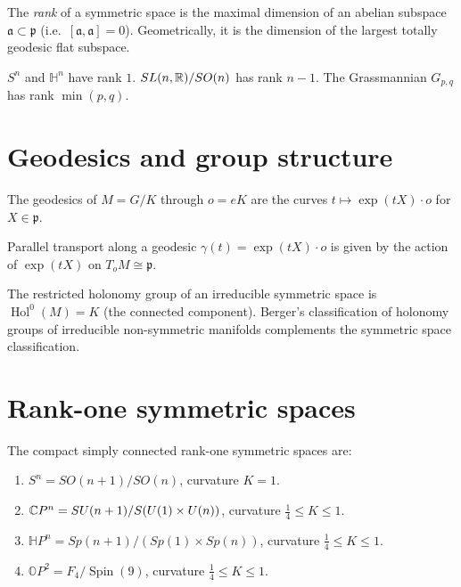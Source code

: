 \begin{definition}[Rank]
The \emph{rank} of a symmetric space is the maximal dimension of an abelian
subspace $\mathfrak{a} \subset \mathfrak{p}$ (i.e.\ $[\mathfrak{a}, \mathfrak{a}] = 0$).
Geometrically, it is the dimension of the largest totally geodesic flat subspace.
\end{definition}

\begin{example}
$S^n$ and $\mathbb{H}^n$ have rank $1$. $SL(n,\mathbb{R})/SO(n)$ has rank $n-1$.
The Grassmannian $G_{p,q}$ has rank $\min(p,q)$.
\end{example}

\section{Geodesics and group structure}

\begin{proposition}[Geodesics]
The geodesics of $M = G/K$ through $o = eK$ are the curves
$t \mapsto \exp(tX) \cdot o$ for $X \in \mathfrak{p}$.
\end{proposition}

\begin{proposition}
Parallel transport along a geodesic $\gamma(t) = \exp(tX) \cdot o$ is given
by the action of $\exp(tX)$ on $T_oM \cong \mathfrak{p}$.
\end{proposition}

\begin{theorem}[Holonomy]
The restricted holonomy group of an irreducible symmetric space is
$\operatorname{Hol}^0(M) = K$ (the connected component). Berger's classification
of holonomy groups of irreducible non-symmetric manifolds complements the
symmetric space classification.
\end{theorem}

\section{Rank-one symmetric spaces}

The compact simply connected rank-one symmetric spaces are:
\begin{enumerate}
    \item $S^n = SO(n+1)/SO(n)$, curvature $K = 1$.
    \item $\mathbb{C} P^n = SU(n+1)/S(U(1) \times U(n))$, curvature $\frac{1}{4} \leq K \leq 1$.
    \item $\mathbb{H}P^n = Sp(n+1)/(Sp(1) \times Sp(n))$, curvature $\frac{1}{4} \leq K \leq 1$.
    \item $\mathbb{O}P^2 = F_4/\operatorname{Spin}(9)$, curvature $\frac{1}{4} \leq K \leq 1$.
\end{enumerate}

